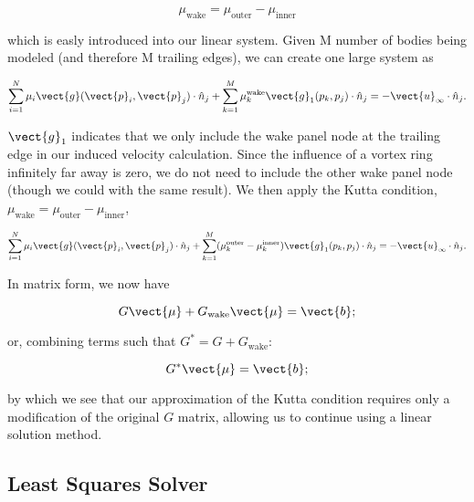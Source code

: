 \begin{equation}
    \mu_\text{wake}= \mu_\text{outer} - \mu_\text{inner}
\end{equation}

\noindent which is easly introduced into our linear system.
Given M number of bodies being modeled (and therefore M trailing edges), we can create one large system as

\begin{equation}
    \sum_{i=1}^N \mu_i \vect{g}(\vect{p}_i,\vect{p}_j) \cdot \hat{n}_j
        + \sum_{k=1}^M \mu^\text{wake}_k \vect{g}_1(p_k, p_j) \cdot \hat{n}_j
        = - \vect{u}_\infty \cdot \hat{n}_j.
\end{equation}

\where \(\vect{g}_1\) indicates that we only include the wake panel node at the
trailing edge in our induced velocity calculation.
Since the influence of a vortex ring infinitely far away is zero,
we do not need to include the other wake panel node (though we could with the same result).
We then apply the Kutta condition, \(\mu_\text{wake}= \mu_\text{outer} - \mu_\text{inner}\),

\begin{equation}
    \sum_{i=1}^N \mu_i \vect{g}(\vect{p}_i,\vect{p}_j) \cdot \hat{n}_j
        + \sum_{k=1}^M (\mu^\text{outer}_k - \mu^\text{inner}_k) \vect{g}_1(p_k, p_j) \cdot \hat{n}_j
        = - \vect{u}_\infty \cdot \hat{n}_j.
\end{equation}

\noindent In matrix form, we now have

\begin{equation}
    G \vect{\mu} + G_\text{wake} \vect{\mu} = \vect{b};
\end{equation}

\noindent or, combining terms such that \(G^* = G + G_\text{wake}\):

\begin{equation}
    G^* \vect{\mu} = \vect{b};
\end{equation}

\noindent by which we see that our approximation of the Kutta condition requires only a modification of the original \(G\) matrix, allowing us to continue using a linear solution method.

\subsection{Least Squares Solver}

